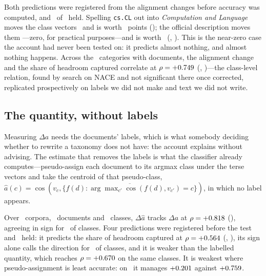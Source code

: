 \documentclass[11pt]{article}
\begin{document}
Both predictions were registered from the alignment changes before accuracy was
computed, and \ArxivHeld\ of \ArxivPredictions\ held. Spelling \texttt{cs.CL}
out into \emph{Computation and Language} moves the class vectors
\ArxivSpellAlign\ and is worth \ArxivSpellGain~points (\ArxivSpellPStat); the
official description moves them \ArxivDescAlign---zero, for practical
purposes---and is worth \ArxivDescGain\ (\ArxivDescPStat,
\HolmArxivDescStat). This is the near-zero case the account had never been
tested on: it predicts almost nothing, and almost nothing happens. Across the
\ArxivRhoN\ categories with documents, the alignment change and the share of
headroom captured correlate at $\rho = +0.749$ (\ArxivRhoPStat,
\HolmArxivRhoStat)---the class-level relation, found by search on NACE and not
significant there once corrected, replicated prospectively on labels we did not
make and text we did not write.

\subsection{The quantity, without labels}
\label{sec:estimate}

Measuring $\Delta a$ needs the documents' labels, which is what somebody
deciding whether to rewrite a taxonomy does not have: the account explains
without advising. The estimate that removes the labels is what the classifier
already computes---pseudo-assign each document to its argmax class under the
terse vectors and take the centroid of that pseudo-class,
$\hat{a}(c) = \cos(v_c, \overline{\{f(d) : \arg\max_{c'} \cos(f(d), v_{c'}) = c\}})$,
in which no label appears.

Over \EstimateCorpora\ corpora, \EstimateDocuments\ documents and
\EstimateClasses\ classes, $\Delta\hat{a}$ tracks $\Delta a$ at $\rho =
+0.818$ (\EstimateVsTruthPStat), agreeing in sign for
\EstimateSignAgreement\ of classes. Four predictions were registered before
the test and \EstimateHeld\ held: it predicts the share of headroom captured
at $\rho = +0.564$ (\EstimateRhoPStat, \HolmEstimateRhoStat), its sign
alone calls the direction for \EstimateSignRule\ of classes, and it is weaker
than the labelled quantity, which reaches $\rho = +0.670$ on the same
classes. It is weakest where pseudo-assignment is least accurate: on
\EstimateWeakest\ it manages $+0.201$ against
$+0.759$.
\end{document}
